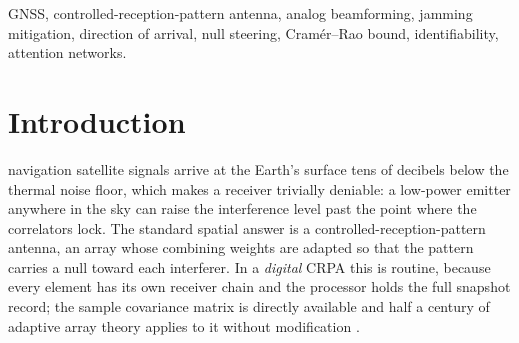 \documentclass[journal]{IEEEtran}
\begin{document}
\begin{abstract}
ill-conditioned
ones --- so we report no single efficiency number, and we do not claim to beat
the bound. A fixed-direction experiment over $\fdDirs$ directions separates
bias from variance exactly and shows the sub-bound behaviour to be bias, not
superefficiency: between the two conditioning halves the bias magnitude grows
$\fdBiasGrowth\times$ while the scatter moves by $\fdScatGrowth\%$, and the
bias vectors point at the
very subsector centres the anchor is built from. Finally, the multi-jammer
limit is shown to be the array's and not the network's: from one to three
jammers the scaled Fisher conditioning degrades $\kappaGrowth\times$ and the
bound itself degrades $\crbGrowth\times$, while the measured error rises only
$\netRmseGrowth\times$.
\end{abstract}

\begin{IEEEkeywords}
GNSS, controlled-reception-pattern antenna, analog beamforming, jamming
mitigation, direction of arrival, null steering, Cram\'er--Rao bound,
identifiability, attention networks.
\end{IEEEkeywords}

\section{Introduction}

 navigation satellite signals arrive at the Earth's
surface tens of decibels below the thermal noise floor, which makes a receiver
trivially deniable: a low-power emitter anywhere in the sky can raise the
interference level past the point where the correlators lock. The standard
spatial answer is a controlled-reception-pattern antenna, an array whose
combining weights are adapted so that the pattern carries a null toward each
interferer. In a \emph{digital} CRPA this is routine, because every element has
its own receiver chain and the processor holds the full snapshot record; the
sample covariance matrix is directly available and half a century of adaptive
array theory applies to it without modification \cite{vanTrees2002,
capon1969, compton1979}.
\end{document}
